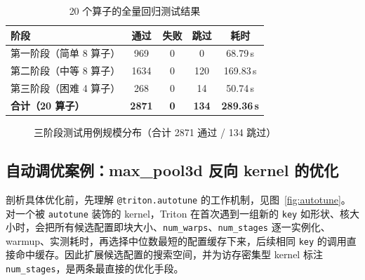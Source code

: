 \begin{table}[!htbp]
\centering\small
\caption{20 个算子的全量回归测试结果}
\label{tab:regress}
\renewcommand{\arraystretch}{1.12}
\begin{tabular}{lcccc}
\toprule
阶段 & 通过 & 失败 & 跳过 & 耗时 \\
\midrule
第一阶段（简单 8 算子） & 969 & 0 & 0 & 68.79\,s \\
第二阶段（中等 8 算子） & 1634 & 0 & 120 & 169.83\,s \\
第三阶段（困难 4 算子） & 268 & 0 & 14 & 50.74\,s \\
\textbf{合计（20 算子）} & \textbf{2871} & \textbf{0} & \textbf{134} & \textbf{289.36\,s} \\
\bottomrule
\end{tabular}
\end{table}

\begin{figure}[!htbp]
\centering
{}
\caption{三阶段测试用例规模分布（合计 2871 通过 / 134 跳过）}
\label{fig:stacked}
\end{figure}

\subsection{自动调优案例：max\_pool3d 反向 kernel 的优化}
剖析具体优化前，先理解 \texttt{@triton.autotune} 的工作机制，见图~\ref{fig:autotune}。对一个被 \texttt{autotune} 装饰的 kernel，Triton 在首次遇到一组新的 \texttt{key} 如形状、核大小时，会把所有候选配置即块大小、\texttt{num\_warps}、\texttt{num\_stages} 逐一实例化、warmup、实测耗时，再选择中位数最短的配置缓存下来，后续相同 \texttt{key} 的调用直接命中缓存。因此扩展候选配置的搜索空间，并为访存密集型 kernel 标注 \texttt{num\_stages}，是两条最直接的优化手段。

